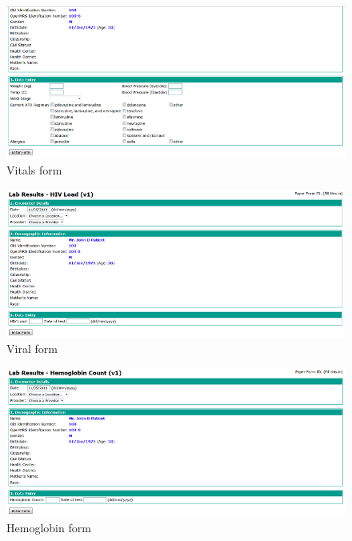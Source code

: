 \documentclass[12pt,letterpaper]{article}
\begin{document}
\begin{figure}\begin{center}
\includegraphics[width=6.5in]{user_guide/vitals_form.png}
\end{center}
\caption{Vitals form}
\label{fig:VITALS_FORM}
\end{figure}

\begin{figure}\begin{center}
\includegraphics[width=6.5in]{user_guide/viral_form.png}
\end{center}
\caption{Viral form}
\label{fig:VIRAL_FORM}
\end{figure}

\begin{figure}\begin{center}
\includegraphics[width=6.5in]{user_guide/hemoglobin_form.png}
\end{center}
\caption{Hemoglobin form}
\label{fig:HEMOGLOBIN_FORM}
\end{figure}
\end{document}
